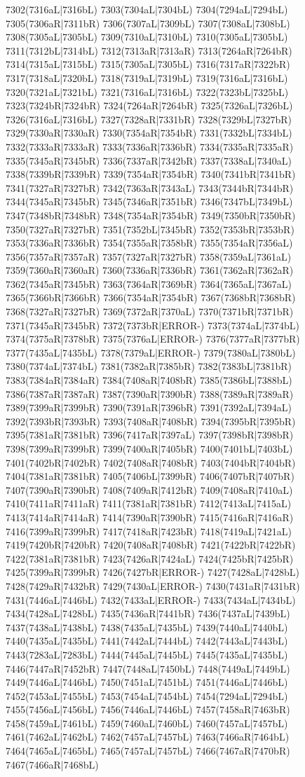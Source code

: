 7302(7316aL|7316bL) 7303(7304aL|7304bL) 7304(7294aL|7294bL) 7305(7306aR|7311bR) 7306(7307aL|7309bL) 7307(7308aL|7308bL) 7308(7305aL|7305bL) 7309(7310aL|7310bL) 7310(7305aL|7305bL) 7311(7312bL|7314bL) 7312(7313aR|7313aR) 7313(7264aR|7264bR) 7314(7315aL|7315bL) 7315(7305aL|7305bL) 7316(7317aR|7322bR) 7317(7318aL|7320bL) 7318(7319aL|7319bL) 7319(7316aL|7316bL) 7320(7321aL|7321bL) 7321(7316aL|7316bL) 7322(7323bL|7325bL) 7323(7324bR|7324bR) 7324(7264aR|7264bR) 7325(7326aL|7326bL) 7326(7316aL|7316bL) 7327(7328aR|7331bR) 7328(7329bL|7327bR) 7329(7330aR|7330aR) 7330(7354aR|7354bR) 7331(7332bL|7334bL) 7332(7333aR|7333aR) 7333(7336aR|7336bR) 7334(7335aR|7335aR) 7335(7345aR|7345bR) 7336(7337aR|7342bR) 7337(7338aL|7340aL) 7338(7339bR|7339bR) 7339(7354aR|7354bR) 7340(7341bR|7341bR) 7341(7327aR|7327bR) 7342(7363aR|7343aL) 7343(7344bR|7344bR) 7344(7345aR|7345bR) 7345(7346aR|7351bR) 7346(7347bL|7349bL) 7347(7348bR|7348bR) 7348(7354aR|7354bR) 7349(7350bR|7350bR) 7350(7327aR|7327bR) 7351(7352bL|7345bR) 7352(7353bR|7353bR) 7353(7336aR|7336bR) 7354(7355aR|7358bR) 7355(7354aR|7356aL) 7356(7357aR|7357aR) 7357(7327aR|7327bR) 7358(7359aL|7361aL) 7359(7360aR|7360aR) 7360(7336aR|7336bR) 7361(7362aR|7362aR) 7362(7345aR|7345bR) 7363(7364aR|7369bR) 7364(7365aL|7367aL) 7365(7366bR|7366bR) 7366(7354aR|7354bR) 7367(7368bR|7368bR) 7368(7327aR|7327bR) 7369(7372aR|7370aL) 7370(7371bR|7371bR) 7371(7345aR|7345bR) 7372(7373bR|ERROR-) 7373(7374aL|7374bL) 7374(7375aR|7378bR) 7375(7376aL|ERROR-) 7376(7377aR|7377bR) 7377(7435aL|7435bL) 7378(7379aL|ERROR-) 7379(7380aL|7380bL) 7380(7374aL|7374bL) 7381(7382aR|7385bR) 7382(7383bL|7381bR) 7383(7384aR|7384aR) 7384(7408aR|7408bR) 7385(7386bL|7388bL) 7386(7387aR|7387aR) 7387(7390aR|7390bR) 7388(7389aR|7389aR) 7389(7399aR|7399bR) 7390(7391aR|7396bR) 7391(7392aL|7394aL) 7392(7393bR|7393bR) 7393(7408aR|7408bR) 7394(7395bR|7395bR) 7395(7381aR|7381bR) 7396(7417aR|7397aL) 7397(7398bR|7398bR) 7398(7399aR|7399bR) 7399(7400aR|7405bR) 7400(7401bL|7403bL) 7401(7402bR|7402bR) 7402(7408aR|7408bR) 7403(7404bR|7404bR) 7404(7381aR|7381bR) 7405(7406bL|7399bR) 7406(7407bR|7407bR) 7407(7390aR|7390bR) 7408(7409aR|7412bR) 7409(7408aR|7410aL) 7410(7411aR|7411aR) 7411(7381aR|7381bR) 7412(7413aL|7415aL) 7413(7414aR|7414aR) 7414(7390aR|7390bR) 7415(7416aR|7416aR) 7416(7399aR|7399bR) 7417(7418aR|7423bR) 7418(7419aL|7421aL) 7419(7420bR|7420bR) 7420(7408aR|7408bR) 7421(7422bR|7422bR) 7422(7381aR|7381bR) 7423(7426aR|7424aL) 7424(7425bR|7425bR) 7425(7399aR|7399bR) 7426(7427bR|ERROR-) 7427(7428aL|7428bL) 7428(7429aR|7432bR) 7429(7430aL|ERROR-) 7430(7431aR|7431bR) 7431(7446aL|7446bL) 7432(7433aL|ERROR-) 7433(7434aL|7434bL) 7434(7428aL|7428bL) 7435(7436aR|7441bR) 7436(7437aL|7439bL) 7437(7438aL|7438bL) 7438(7435aL|7435bL) 7439(7440aL|7440bL) 7440(7435aL|7435bL) 7441(7442aL|7444bL) 7442(7443aL|7443bL) 7443(7283aL|7283bL) 7444(7445aL|7445bL) 7445(7435aL|7435bL) 7446(7447aR|7452bR) 7447(7448aL|7450bL) 7448(7449aL|7449bL) 7449(7446aL|7446bL) 7450(7451aL|7451bL) 7451(7446aL|7446bL) 7452(7453aL|7455bL) 7453(7454aL|7454bL) 7454(7294aL|7294bL) 7455(7456aL|7456bL) 7456(7446aL|7446bL) 7457(7458aR|7463bR) 7458(7459aL|7461bL) 7459(7460aL|7460bL) 7460(7457aL|7457bL) 7461(7462aL|7462bL) 7462(7457aL|7457bL) 7463(7466aR|7464bL) 7464(7465aL|7465bL) 7465(7457aL|7457bL) 7466(7467aR|7470bR) 7467(7466aR|7468bL) 